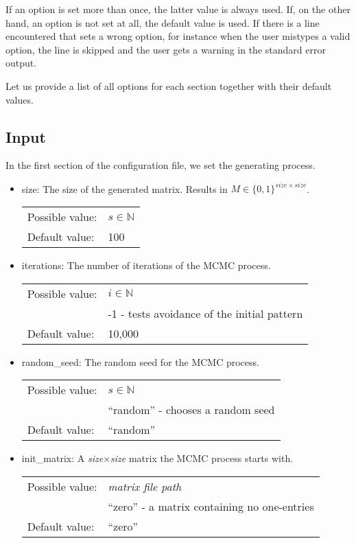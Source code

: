 If an option is set more than once, the latter value is always used. If, on the other hand, an option is not set at all, the default value is used. If there is a line encountered that sets a wrong option, for instance when the user mistypes a valid option, the line is skipped and the user gets a warning in the standard error output.

Let us provide a list of all options for each section together with their default values.

\subsection{Input}
In the first section of the configuration file, we set the generating process.
\begin{itemize}
\item size: The size of the generated matrix. Results in $M\in\{0,1\}^{size\times size}$.

\begin{tabular}{ll}
Possible value: & $s\in\mathbb{N}$ \\
Default value: & 100
\end{tabular}

\item iterations: The number of iterations of the MCMC process.

\begin{tabular}{ll}
Possible value: & $i\in\mathbb{N}$ \\
& -1 - tests avoidance of the initial pattern \\
Default value: & 10,000
\end{tabular}

\item random\_seed: The random seed for the MCMC process.

\begin{tabular}{ll}
Possible value: & $s\in\mathbb{N}$ \\
& ``random'' - chooses a random seed \\
Default value: & ``random''
\end{tabular}

\item init\_matrix: A \textit{size}$\times$\textit{size} matrix the MCMC process starts with.

\begin{tabular}{ll}
Possible value: & \textit{matrix file path} \\
& ``zero'' - a matrix containing no one-entries \\
Default value: & ``zero''
\end{tabular}


\end{itemize}

